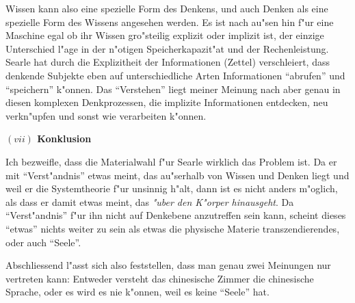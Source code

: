 \documentclass[a4paper, emulatestandardclasses, 12pt]{scrartcl}
\begin{document}
\begin{onehalfspace}
Wissen kann also eine spezielle Form des Denkens, und auch Denken als eine spezielle Form des Wissens angesehen werden. Es ist nach au"sen hin f"ur eine Maschine egal ob ihr Wissen gro"steilig explizit oder implizit ist, der einzige Unterschied l"age in der n"otigen Speicherkapazit"at und der Rechenleistung. Searle hat durch die Explizitheit der Informationen (Zettel) verschleiert, dass denkende Subjekte eben auf unterschiedliche Arten  Informationen "`abrufen"' und  "`speichern"' k"onnen. Das "`Verstehen"' liegt meiner Meinung nach aber genau in diesen komplexen Denkprozessen, die implizite Informationen entdecken, neu verkn"upfen und sonst wie verarbeiten k"onnen.

\vspace{5mm}
\noindent\textbf{$(vii)$ Konklusion}

\noindent Ich bezweifle, dass die Materialwahl f"ur Searle wirklich das Problem ist. Da er mit "`Verst"andnis"' etwas meint, das au"serhalb von Wissen und Denken liegt und weil er die Systemtheorie f"ur unsinnig h"alt, dann ist es nicht anders m"oglich, als dass er damit etwas meint, das \emph{"uber den K"orper hinausgeht}. Da "`Verst"andnis"' f"ur ihn nicht auf Denkebene anzutreffen sein kann, scheint dieses "`etwas"' nichts weiter zu sein als etwas die physische Materie transzendierendes, oder auch "`Seele"'.

Abschliessend l"asst sich also feststellen, dass man genau zwei Meinungen nur vertreten kann: Entweder versteht das chinesische Zimmer die chinesische Sprache, oder es wird es nie k"onnen, weil es keine "`Seele"' hat. 





 
 


\end{onehalfspace}
\end{document}
